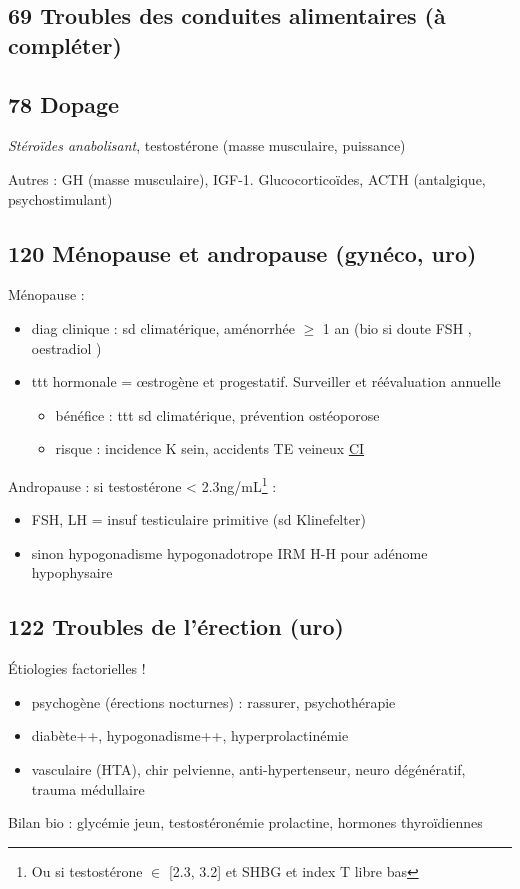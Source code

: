 \documentclass[11pt]{article}
\begin{document}
\subsection{69 Troubles des conduites alimentaires (à compléter)}
\label{sec:org15eb36f}
\subsection{78 Dopage}
\label{sec:orgb619925}
\emph{Stéroïdes anabolisant}, testostérone (\inc masse musculaire, puissance)

Autres : GH (\inc masse musculaire), IGF-1. Glucocorticoïdes, ACTH (antalgique, psychostimulant)
\subsection{120 Ménopause et andropause (gynéco, uro)}
\label{sec:org1e3ca70}
Ménopause :
\begin{itemize}
\item diag clinique : sd climatérique, aménorrhée \(\ge\) 1 an (bio si doute FSH \inc, oestradiol \inc)
\item ttt hormonale = \oe{}strogène et progestatif. Surveiller et réévaluation annuelle
\begin{itemize}
\item bénéfice : ttt sd climatérique, prévention ostéoporose
\item risque : \inc incidence K sein, \inc accidents TE veineux \thus \uline{CI}
\end{itemize}
\end{itemize}
Andropause : si testostérone < 2.3ng/mL\footnote{Ou si testostérone \(\in\) [2.3, 3.2] et SHBG et index T libre bas} :
\begin{itemize}
\item FSH, LH \inc = insuf testiculaire primitive (sd Klinefelter)
\item sinon hypogonadisme hypogonadotrope \thus IRM H-H pour adénome hypophysaire
\end{itemize}

\subsection{122 Troubles de l'érection  (uro)}
\label{sec:org3416c89}
Étiologies factorielles !
\begin{itemize}
\item psychogène (érections nocturnes) : rassurer, psychothérapie
\item diabète++, hypogonadisme++, hyperprolactinémie
\item vasculaire (HTA), chir pelvienne, anti-hypertenseur, neuro dégénératif, trauma médullaire
\end{itemize}
Bilan bio : glycémie jeun, testostéronémie \textpm{} prolactine, hormones thyroïdiennes
\end{document}
